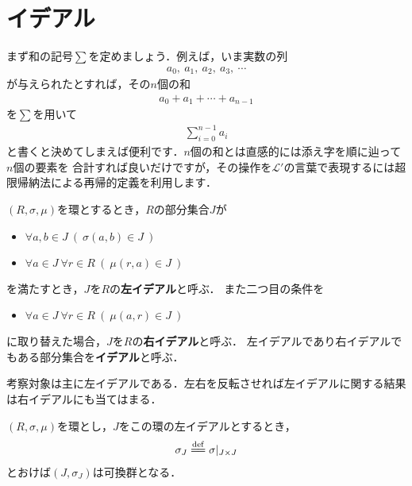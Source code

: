 \section{イデアル}
	まず和の記号$\sum$を定めましょう．例えば，いま実数の列
	\begin{align}
		a_0,\ a_1,\ a_2,\ a_3,\ \cdots
	\end{align}
	が与えられたとすれば，その$n$個の和
	\begin{align}
		a_0 + a_1 + \cdots + a_{n-1}
	\end{align}
	を$\sum$を用いて
	\begin{align}
		\sum_{i=0}^{n-1} a_i
	\end{align}
	と書くと決めてしまえば便利です．$n$個の和とは直感的には添え字を順に辿って$n$個の要素を
	合計すれば良いだけですが，その操作を$\mathcal{L}'$の言葉で表現するには超限帰納法による再帰的定義を利用します．
	
	\begin{screen}
		\begin{dfn}[イデアル]
			$(R,\sigma,\mu)$を環とするとき，$R$の部分集合$J$が
			\begin{itemize}
				\item $\forall a,b \in J\ (\ \sigma(a,b) \in J\ )$
				\item $\forall a \in J\ \forall r \in R\ (\ \mu(r,a) \in J\ )$
			\end{itemize}
			を満たすとき，$J$を$R$の{\bf 左イデアル}と呼ぶ．
			また二つ目の条件を
			\begin{itemize}
				\item $\forall a \in J\ \forall r \in R\ (\ \mu(a,r) \in J\ )$
			\end{itemize}
			に取り替えた場合，$J$を$R$の{\bf 右イデアル}と呼ぶ．
			左イデアルであり右イデアルでもある部分集合を{\bf イデアル}と呼ぶ．
		\end{dfn}
	\end{screen}
	
	考察対象は主に左イデアルである．左右を反転させれば左イデアルに関する結果は右イデアルにも当てはまる．
	
	\begin{screen}
		\begin{thm}[左イデアルは加法に関して群をなす]
			$(R,\sigma,\mu)$を環とし，$J$をこの環の左イデアルとするとき，
			\begin{align}
				\sigma_J \defeq \sigma|_{J \times J}
			\end{align}
			とおけば$(J,\sigma_J)$は可換群となる．
		\end{thm}
	\end{screen}
	
	
	